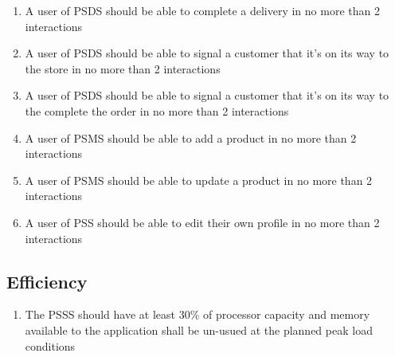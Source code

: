 \begin{enumerate}[resume, label=USE-\arabic*]
    \item A user of PSDS should be able to complete a delivery in no more 
    than 2 interactions
    \item A user of PSDS should be able to signal a customer that it’s on its 
    way to the store in no more than 2 interactions
    \item A user of PSDS should be able to signal a customer that it’s on its
    way to the complete the order in no more than 2 interactions
    \item A user of PSMS should be able to add a product in no more 
    than 2 interactions
    \item A user of PSMS should be able to update a product in no more 
    than 2 interactions
    \item A user of PSS should be able to edit their own profile in no more 
    than 2 interactions
    
\end{enumerate}

\subsection{Efficiency}
\begin{enumerate}[label=EFF-\arabic*]
    \item The PSSS should have at least 30\% of processor capacity and memory 
    available to the application shall be un-usued at the planned 
    peak load conditions
\end{enumerate}

